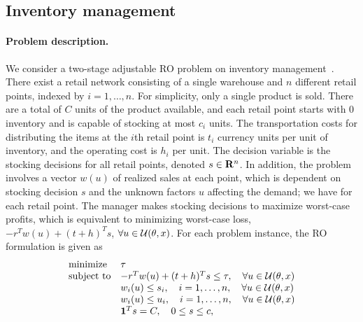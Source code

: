 \subsection{Inventory management}
\label{sec:inv_example}
\paragraph{Problem description. } We consider a two-stage adjustable \gls{RO} problem on inventory management~\citep[Section 5.2.1]{pareto}. There exist a retail network consisting of a single warehouse and $n$ different retail points, indexed by $i = 1, \dots, n$. For simplicity, only a single product is sold.
There are a total of $C$ units of the product available, and each retail point starts with $0$ inventory and is capable of stocking at most $c_i$ units.
The transportation costs for distributing the items at the $i$th retail point is $t_i$ currency units per unit of inventory, and the operating cost is $h_i$ per unit.
The decision variable is the stocking decisions for all retail points, denoted $s \in {\mathbf R}^n$.
In addition, the problem involves a vector $w(u)$ of realized sales at each point, which is dependent on stocking decision $s$ and the unknown factors $u$ affecting the demand; we have
for each retail point.
The manager makes stocking decisions to maximize worst-case profits, which is equivalent to minimizing worst-case loss, 
$-r^Tw(u) + (t+h)^Ts$, $\forall u\in {\mathcal{U}}(\theta,x)$.
For each problem instance, the \gls{RO} formulation is given as
\begin{equation}
	\label{eq:inv_1}
	\begin{array}{ll}
		\mbox{minimize} & \tau\\
		\mbox{subject to} & -r^Tw(u) + (t+h)^Ts \le \tau, \quad \forall u\in {\mathcal{U}}(\theta,x)\\
		& w_i(u) \leq s_i, \quad i = 1, \dots, n, \quad \forall u\in {\mathcal{U}}(\theta,x)\\
		& w_i(u) \leq u_i, \quad i = 1, \dots, n, \quad \forall u\in {\mathcal{U}}(\theta,x)\\
			& \mathbf 1^Ts = C,\quad 0 \le s \leq c,\\
	\end{array}
\end{equation}
